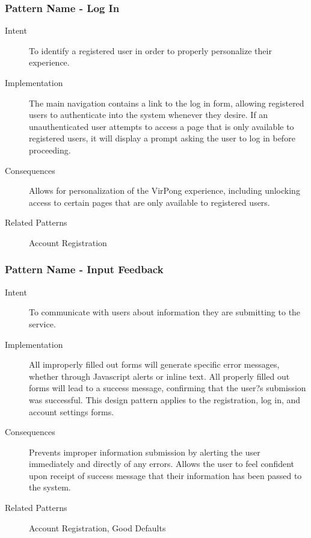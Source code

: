 \subsubsection{Pattern Name - Log In}
\begin{description}
\item[Intent] To identify a registered user in order to properly personalize their experience.
\item[Implementation] The main navigation contains a link to the log in form, allowing registered users to authenticate into the system whenever they desire. If an unauthenticated user attempts to access a page that is only available to registered users, it will display a prompt asking the user to log in before proceeding.
\item[Consequences] Allows for personalization of the VirPong experience, including unlocking access to certain pages that are only available to registered users.
\item[Related Patterns] Account Registration
\end{description}
\subsubsection{Pattern Name - Input Feedback}
\begin{description}
\item[Intent] To communicate with users about information they are submitting to the service.
\item[Implementation] All improperly filled out forms will generate specific error messages, whether through Javascript alerts or inline text. All properly filled out forms will lead to a success message, confirming that the user?s submission was successful. This design pattern applies to the registration, log in, and account settings forms.
\item[Consequences] Prevents improper information submission by alerting the user immediately and directly of any errors. Allows the user to feel confident upon receipt of success message that their information has been passed to the system.
\item[Related Patterns] Account Registration, Good Defaults
\end{description}
